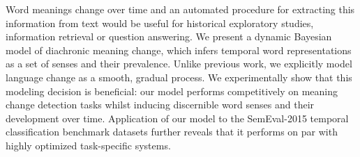 Word meanings change over time and an automated procedure for extracting this information from text would be useful for historical exploratory studies, information retrieval or question answering. We present a dynamic Bayesian model of diachronic meaning change, which infers temporal word representations as a set of senses and their prevalence. Unlike previous work, we explicitly model language change as a smooth, gradual process. We experimentally show that this modeling decision is beneficial: our model performs competitively on meaning change detection tasks whilst inducing discernible word senses and their development over time. Application of our model to the SemEval-2015 temporal classification benchmark datasets further reveals that it performs on par with highly optimized task-specific systems.
